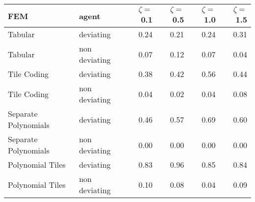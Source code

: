 \begin{tabular}{llrrrr}
  \hline
FEM & agent & $\zeta =$ 0.1 & $\zeta =$ 0.5 & $\zeta =$ 1.0 & $\zeta =$ 1.5 \\ 
  \hline
Tabular & deviating & 0.24 & 0.21 & 0.24 & 0.31 \\ 
  Tabular & non deviating & 0.07 & 0.12 & 0.07 & 0.04 \\ 
  Tile Coding & deviating & 0.38 & 0.42 & 0.56 & 0.44 \\ 
  Tile Coding & non deviating & 0.04 & 0.02 & 0.04 & 0.08 \\ 
  Separate Polynomials & deviating & 0.46 & 0.57 & 0.69 & 0.60 \\ 
  Separate Polynomials & non deviating & 0.00 & 0.00 & 0.00 & 0.00 \\ 
  Polynomial Tiles & deviating & 0.83 & 0.96 & 0.85 & 0.84 \\ 
  Polynomial Tiles & non deviating & 0.10 & 0.08 & 0.04 & 0.09 \\ 
   \hline
\end{tabular}
